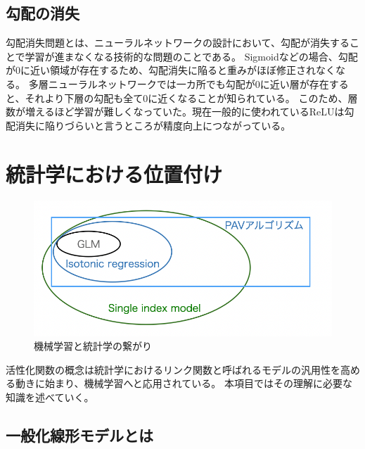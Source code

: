 \subsection{勾配の消失}
勾配消失問題とは、ニューラルネットワークの設計において、勾配が消失することで学習が進まなくなる技術的な問題のことである。
Sigmoidなどの場合、勾配が0に近い領域が存在するため、勾配消失に陥ると重みがほぼ修正されなくなる。
多層ニューラルネットワークでは一カ所でも勾配が0に近い層が存在すると、それより下層の勾配も全て0に近くなることが知られている。
このため、層数が増えるほど学習が難しくなっていた。現在一般的に使われているReLUは勾配消失に陥りづらいと言うところが精度向上につながっている。





\section{統計学における位置付け}

\begin{figure}[hbtp]
        \includegraphics[width=15cm]{asset/machine_statistics.png}
            \caption{機械学習と統計学の繋がり}
            \label{glm}
\end{figure}

活性化関数の概念は統計学におけるリンク関数と呼ばれるモデルの汎用性を高める動きに始まり、機械学習へと応用されている。
本項目ではその理解に必要な知識を述べていく。



\subsection{一般化線形モデルとは}


